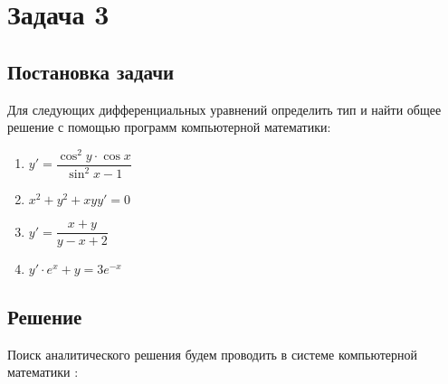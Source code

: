 \newcommand{\equationFirst}{
	{y}' = \dfrac{\cos^{2}{y} \cdot \cos{x}}{\sin^2{x} - 1}
}

\newcommand{\equationSecond}{
	{x}^2 + {y}^2 + xyy' = 0 
}

\newcommand{\equationThird}{
	{y}' = \dfrac{x + y}{y - x + 2}
}

\newcommand{\equationFourth}{
	{y}' \cdot e^{x} + {y} = 3e^{-x}
}

\section{Задача 3}
\subsection{Постановка задачи}
Для следующих дифференциальных уравнений определить тип и найти общее решение с помощью программ компьютерной математики:

\begin{enumerate}                                                   
	\item $ \equationFirst $          
	\item $ \equationSecond $
	\item $ \equationThird $                             
	\item $ \equationFourth $
\end{enumerate}

\subsection{Решение}

Поиск аналитического решения будем проводить в системе компьютерной математики \wolfram:

